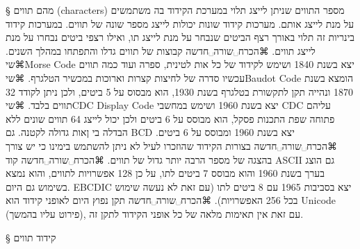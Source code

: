 § מהם תווים (characters)
מספר התווים שניתן לייצג תלוי במערכת הקידוד בה משתמשים על מנת לייצג אותם. מערכות קידוד שונות יכולות לייצג מספר שונה של תווים. במערכות קידוד בינריות זה תלוי באורך רצף הביטים שנבחר על מנת לייצג תו, ואילו רצפי ביטים נבחרו על מנת לייצג תווים.
⌘הכרח␣שורה␣חדשה
קבוצות של תווים גדלו והתפתחו במהלך השנים. ⌘שי{Morse Code} יצא בשנת 1840 ושימש לקידוד של כל אות לטינית, ספרה ועוד כמה תווים עכשיו סדרה של לחיצות קצרות וארוכות במכשיר הטלגרף. ⌘שי{Baudot Code} הומצא בשנת 1870 ונהייה תקן לתקשורת בטלגרף בשנת 1930, הוא מבסוס על 5 ביטים, ולכן ניתן לקודד 32 תווים בלבד. ⌘שי{CDC Display Code} יצא בשנת 1960 ושימש במחשבי CDC עליהם פתוחה שפת התכנות פסקל, הוא מבוסס על 6 ביטים ולכן יכול לייצג 64 תווים שונים ללא הבדלה בי ןאות גדולה לקטנה. גם BCD יצא בשנת 1960 ומבוסס על 6 ביטים.
⌘הכרח␣שורה␣חדשה
בצורות הקידוד שהוזכרו לעיל לא ניתן להשתמש בימינו כי יש צורך בהצגה של מספר הרבה יותר גדול של תווים.
⌘הכרח␣שורה␣חדשה
קוד ASCII גם הוצג בערך בשנת 1960 והוא מבוסס 7 ביטים לתו, על כן 128 אפשרויות לתווים, והוא נמצא בשימוש גם היום. EBCDIC יצא בסביבות 1965 עם 8 ביטים לתו (עם זאת לא נעשה שימוש בכל 256 האפשרויות).
⌘הכרח␣שורה␣חדשה
תקן נפוץ היום לאופני קידוד הוא Unicode (פירוט עליו בהמשך), עם זאת אין תאימות מלאה של כל אופני הקידוד לתקן זה.

§ קידוד תווים
